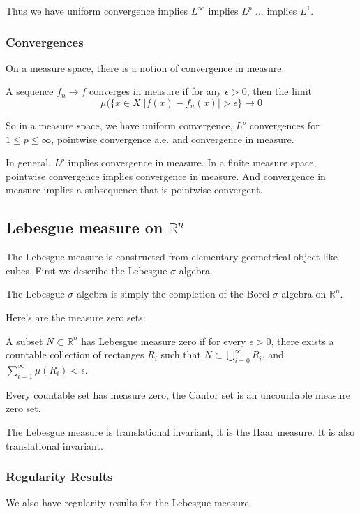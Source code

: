 \documentclass[main.tex]{subfiles}
\begin{document}
Thus we have uniform convergence implies $L^\infty$ implies $L^p$ ... implies $L^1$.

\subsubsection{Convergences}
On a measure space, there is a notion of convergence in measure:

\begin{definition}
A sequence $f_n \rightarrow f$ converges in measure if for any $\epsilon > 0$, then the limit 
$$
\mu(\{x \in X | |f(x) - f_n(x)| > \epsilon\} \rightarrow 0
$$

\end{definition}
So in a measure space, we have uniform convergence, $L^p$ convergences for $1 \leq p \leq \infty$, pointwise convergence a.e. and convergence in measure.

In general, $L^p$ implies convergence in measure. In a finite measure space, pointwise convergence implies convergence in measure. And convergence in measure implies a subsequence that is pointwise convergent.
\subsection{Lebesgue measure on $\mathbb{R}^n$}

The Lebesgue measure is constructed from elementary geometrical object like cubes. First we describe the Lebesgue $\sigma$-algebra.

\begin{theorem}
The Lebesgue $\sigma$-algebra is simply the completion of the Borel $\sigma$-algebra on $\mathbb{R}^n$.
\end{theorem}

Here's are the measure zero sets:
\begin{lemma}
A subset $N \subset \mathbb{R}^n$ has Lebesgue measure zero if for every $\epsilon > 0$, there exists a countable collection of rectanges $R_i$ such that $N \subset \bigcup_{i = 0}^\infty R_i$, and $\sum_{i = 1} ^\infty \mu(R_i) < \epsilon$.
\end{lemma}

Every countable set has measure zero, the Cantor set is an uncountable measure zero set.

The Lebesgue measure is translational invariant, it is the Haar measure. It is also translational invariant. 


\subsubsection{Regularity Results}
We also have regularity results for the Lebesgue measure. 
\end{document}
